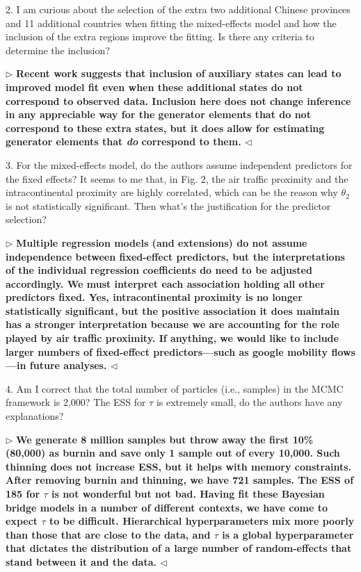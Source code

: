 \documentclass[12pt]{article}
\newenvironment{reply}{$\triangleright$\bfseries}{$\triangleleft$}
\begin{document}
2. I am curious about the selection of the extra two additional Chinese provinces and 11 additional countries when fitting the mixed-effects model and how the inclusion of the extra regions improve the fitting. Is there any criteria to determine the inclusion?


\begin{reply}
Recent work \citep{gotovos2021scaling} suggests that inclusion of auxiliary states can lead to improved model fit even when these additional states do not correspond to observed data.  Inclusion here does not change inference in any appreciable way for the generator elements that do not correspond to these extra states, but it does allow for estimating generator elements that \emph{do} correspond to them.      
\end{reply}

3. For the mixed-effects model, do the authors assume independent predictors for the fixed effects? It seems to me that, in Fig. 2, the air traffic proximity and the intracontinental proximity are highly correlated, which can be the reason why $\theta_2$ is not statistically significant. Then what’s the justification for the predictor selection?


\begin{reply}
Multiple regression models (and extensions) do not assume independence between fixed-effect predictors, but the interpretations of the individual regression coefficients do need to be adjusted accordingly. We must interpret each association holding all other predictors fixed.  Yes, intracontinental proximity is no longer statistically significant, but the positive association it does maintain has a stronger interpretation because we are accounting for the role played by air traffic proximity.    If anything, we would like to include larger numbers of fixed-effect predictors---such as google mobility flows \citep{lemey2021untangling}---in future analyses.
\end{reply}

4. Am I correct that the total number of particles (i.e., samples) in the MCMC framework is 2,000? The ESS for $\tau$ is extremely small, do the authors have any explanations?


\begin{reply}
We generate 8 million samples but throw away the first 10\% (80,000) as burnin and save only 1 sample out of every 10,000.  Such thinning does not increase ESS, but it helps with memory constraints.  After removing burnin and thinning, we have 721 samples.   The ESS of 185 for $\tau$ is not wonderful but not bad.  Having fit these Bayesian bridge models in a number of different contexts, we have come to expect $\tau$ to be difficult.   Hierarchical hyperparameters mix more poorly than those that are close to the data, and $\tau$ is a global hyperparameter that dictates the distribution of a large number of random-effects that stand between it and the data.
\end{reply}
\end{document}
